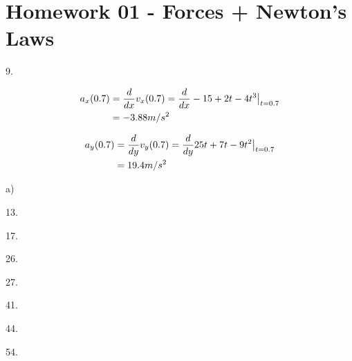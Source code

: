 \documentclass{scrreprt} %
\begin{document}
\section{Homework 01 - Forces + Newton's Laws}

9.

\begin{align*}
	a_x(0.7) &= \frac{d}{dx}v_x(0.7) = \evalat{\frac{d}{dx}-15 + 2t - 4t^3}{t=0.7} \\
			 &= -3.88 m/s^2
\end{align*}

\begin{align*}
	a_y(0.7) &= \frac{d}{dy}v_y(0.7) = \evalat{\frac{d}{dy}25t + 7t - 9t^2}{t=0.7} \\
			 &= 19.4 m/s^2
\end{align*}

a) 


13.

17.

26.

27.

41.

44.

54.
\end{document}
